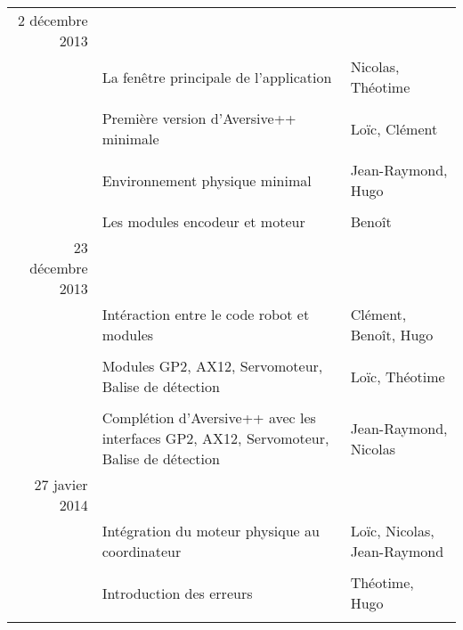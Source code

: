 \begin{tabular}{rp{8cm}|p{3cm}}

    2 décembre 2013 &&\\
    
    &
    La fenêtre principale de l'application &
    Nicolas, Théotime \\
    
    &&\\
    
    &
    Première version d'Aversive++ minimale &
    Loïc, Clément \\
    
    &&\\
    
    &
    Environnement physique minimal &
    Jean-Raymond, Hugo \\
    
    &&\\
    
    &
    Les modules encodeur et moteur &
    Benoît \\
    
    23 décembre 2013 &&\\
    
    &
    Intéraction entre le code robot et modules &
    Clément, Benoît, Hugo \\
    
    &&\\
    
    &
    Modules GP2, AX12, Servomoteur, Balise de détection &
    Loïc, Théotime \\
    
    &&\\
    
    &
    Complétion d'Aversive++ avec les interfaces GP2, AX12, Servomoteur, Balise de détection &
    Jean-Raymond, Nicolas\\

    27 javier 2014 &&\\

    &
    Intégration du moteur physique au coordinateur &
    Loïc, Nicolas, Jean-Raymond \\
    
    &&\\
    
    &
    Introduction des erreurs &
    Théotime, Hugo \\
    
    &&\\
    

\end{tabular}
